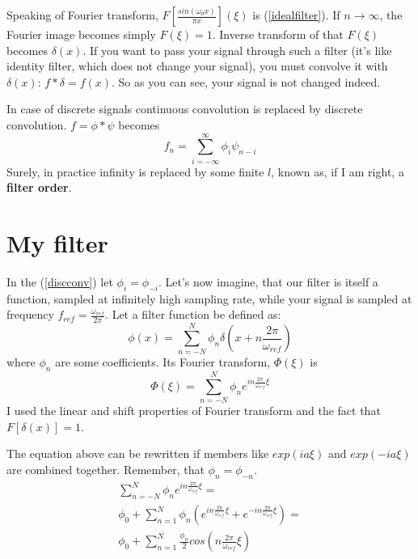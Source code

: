 \documentclass[a4paper,11pt,fleqn]{article}
\let\oldref\ref
\renewcommand{\ref}[1]{(\oldref{#1})}
\begin{document}
Speaking of Fourier transform, $F[\frac{sin (\omega_{0} x)}{\pi x}](\xi)$ is \ref{idealfilter}. If $n \to \infty$, the Fourier image becomes simply $F(\xi) = 1$. Inverse
transform of that $F(\xi)$ becomes $\delta(x)$. If you want to pass your signal through such a filter (it's like identity filter, which does not change your signal), you must
convolve it with $\delta(x)$: $f*\delta = f(x)$. So as you can see, your signal is not changed indeed.

In case of discrete signals continuous convolution is replaced by discrete convolution. $f = \phi*\psi$ becomes
\begin{equation}
\label{discconv}
f_{n} = \sum_{i=-\infty}^{\infty}\phi_{i}\psi_{n-i}
\end{equation}
Surely, in practice infinity is replaced by some finite $l$, known as, if I am right, a \textbf{filter order}.

\section{My filter}
In the \ref{discconv} let $\phi_{i} = \phi_{-i}$. Let's now imagine, that our filter is itself a function, sampled at infinitely high sampling rate, while your signal is sampled at frequency
$f_{ref}=\frac{\omega_{ref}}{2 \pi}$. Let a filter function be defined as:
\begin{equation}
\phi(x) = \sum_{n=-N}^{N} \phi_{n} \delta(x+n \frac{2 \pi}{\omega_{ref}})
\end{equation}
where $\phi_{n}$ are some coefficients. Its Fourier transform, $\Phi(\xi)$ is
\begin{equation}
\Phi(\xi) = \sum_{n=-N}^{N} \phi_{n} e^{i n \frac{2 \pi}{\omega_{ref}} \xi}
\end{equation}
I used the linear and shift properties of Fourier transform and the fact that $F[\delta(x)] = 1$.

The equation above can be rewritten if members like $exp(ia\xi)$ and $exp(-ia\xi)$ are combined together. Remember, that $\phi_{n} = \phi_{-n}$.
\begin{equation}
\begin{aligned}
\sum_{n=-N}^{N} \phi_{n} e^{i n \frac{2 \pi}{\omega_{ref}} \xi} = \\
\phi_{0} + \sum_{n=1}^{N} \phi_{n} (e^{i n \frac{2 \pi}{\omega_{ref}} \xi} + e^{-i n \frac{2 \pi}{\omega_{ref}} \xi}) = \\
\phi_{0} + \sum_{n=1}^{N} \frac{\phi_{n}}{2} cos(n \frac{2 \pi}{\omega_{ref}} \xi)
\end{aligned}
\end{equation}
\end{document}
